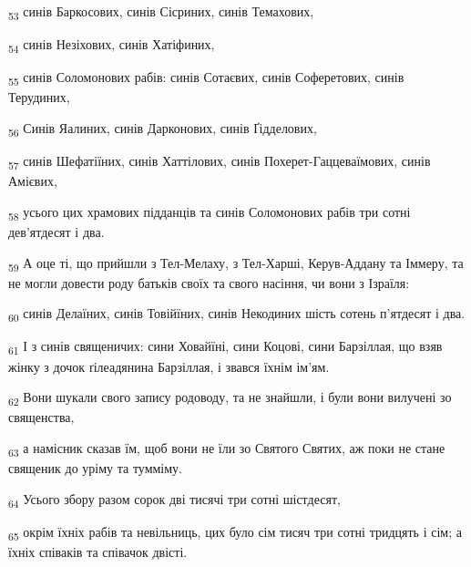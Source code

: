 \begin{tcolorbox}
\textsubscript{53} синів Баркосових, синів Сісриних, синів Темахових,
\end{tcolorbox}
\begin{tcolorbox}
\textsubscript{54} синів Незіхових, синів Хатіфиних,
\end{tcolorbox}
\begin{tcolorbox}
\textsubscript{55} синів Соломонових рабів: синів Сотаєвих, синів Соферетових, синів Терудиних,
\end{tcolorbox}
\begin{tcolorbox}
\textsubscript{56} Синів Яалиних, синів Дарконових, синів Ґідделових,
\end{tcolorbox}
\begin{tcolorbox}
\textsubscript{57} синів Шефатіїних, синів Хаттілових, синів Похерет-Гаццеваїмових, синів Амієвих,
\end{tcolorbox}
\begin{tcolorbox}
\textsubscript{58} усього цих храмових підданців та синів Соломонових рабів три сотні дев'ятдесят і два.
\end{tcolorbox}
\begin{tcolorbox}
\textsubscript{59} А оце ті, що прийшли з Тел-Мелаху, з Тел-Харші, Керув-Аддану та Іммеру, та не могли довести роду батьків своїх та свого насіння, чи вони з Ізраїля:
\end{tcolorbox}
\begin{tcolorbox}
\textsubscript{60} синів Делаїних, синів Товійїних, синів Некодиних шість сотень п'ятдесят і два.
\end{tcolorbox}
\begin{tcolorbox}
\textsubscript{61} І з синів священичих: сини Ховайїні, сини Коцові, сини Барзіллая, що взяв жінку з дочок ґілеадянина Барзіллая, і звався їхнім ім'ям.
\end{tcolorbox}
\begin{tcolorbox}
\textsubscript{62} Вони шукали свого запису родоводу, та не знайшли, і були вони вилучені зо священства,
\end{tcolorbox}
\begin{tcolorbox}
\textsubscript{63} а намісник сказав їм, щоб вони не їли зо Святого Святих, аж поки не стане священик до уріму та тумміму.
\end{tcolorbox}
\begin{tcolorbox}
\textsubscript{64} Усього збору разом сорок дві тисячі три сотні шістдесят,
\end{tcolorbox}
\begin{tcolorbox}
\textsubscript{65} окрім їхніх рабів та невільниць, цих було сім тисяч три сотні тридцять і сім; а їхніх співаків та співачок двісті.
\end{tcolorbox}
